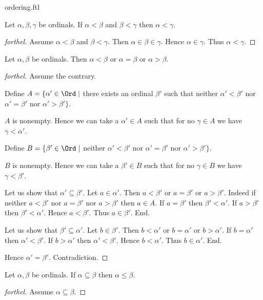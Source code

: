 \documentclass{naproche-library}
\begin{document}
\begin{smodule}{ordering.ftl}
  \begin{proposition}[forthel,id=SET_THEORY_02_7098683017396224]
    Let $\alpha, \beta, \gamma$ be ordinals.
    If $\alpha < \beta$ and $\beta < \gamma$ then $\alpha < \gamma$.
  \end{proposition}
  \begin{proof}[forthel]
    Assume $\alpha < \beta$ and $\beta < \gamma$.
    Then $\alpha \in \beta \in \gamma$.
    Hence $\alpha \in \gamma$.
    Thus $\alpha < \gamma$.
  \end{proof}

  \begin{proposition}[forthel,id=SET_THEORY_02_1718825707896832]
    Let $\alpha, \beta$ be ordinals.
    Then $\alpha < \beta$ or $\alpha = \beta$ or $\alpha > \beta$.
  \end{proposition}
  \begin{proof}[forthel]
    Assume the contrary.
    
    Define $A = \{ \alpha' \in \Ord \mid$ there exists an ordinal $\beta'$ such that neither $\alpha' < \beta'$ nor $\alpha' = \beta'$ nor $\alpha' > \beta' \}$.
    
    $A$ is nonempty.
    Hence we can take a $\alpha' \in A$ such that for no $\gamma \in A$ we have $\gamma < \alpha'$.
    
    Define $B = \{ \beta' \in \Ord \mid$ neither $\alpha' < \beta'$ nor $\alpha' = \beta'$ nor $\alpha' > \beta' \}$.
    
    $B$ is nonempty.
    Hence we can take a $\beta' \in B$ such that for no $\gamma \in B$ we have $\gamma < \beta'$.

    Let us show that $\alpha' \subseteq \beta'$.
      Let $a \in \alpha'$.
      Then $a < \beta'$ or $a = \beta'$ or $a > \beta'$.
      Indeed if neither $a < \beta'$ nor $a = \beta'$ nor $a > \beta'$ then
      $a \in A$.
      If $a = \beta'$ then $\beta' < \alpha'$.
      If $a > \beta'$ then $\beta' < \alpha'$.
      Hence $a < \beta'$.
      Thus $a \in \beta'$.
    End.

    Let us show that $\beta' \subseteq \alpha'$.
      Let $b \in \beta'$.
      Then $b < \alpha'$ or $b = \alpha'$ or $b > \alpha'$.
      If $b = \alpha'$ then $\alpha' < \beta'$.
      If $b > \alpha'$ then $\alpha' < \beta'$.
      Hence $b < \alpha'$.
      Thus $b \in \alpha'$.
    End.

    Hence $\alpha' = \beta'$.
    Contradiction.
  \end{proof}

  \begin{proposition}[forthel,id=SET_THEORY_02_610496856195072]
    Let $\alpha, \beta$ be ordinals.
    If $\alpha \subseteq \beta$ then $\alpha \leq \beta$.
  \end{proposition}
  \begin{proof}[forthel]
    Assume $\alpha \subseteq \beta$.


\end{proof}
\end{smodule}
\end{document}

